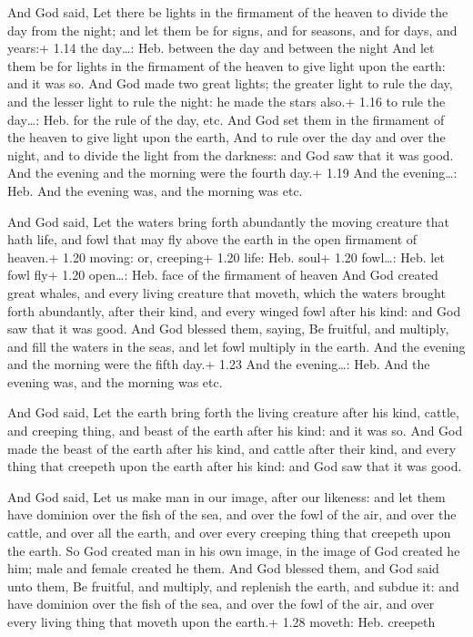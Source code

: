  And God said, Let there be lights in the firmament of
the heaven to divide the day from the night; and let them be for signs,
and for seasons, and for days, and years:+ 1.14 the day\ldots: Heb.
between the day and between the night  And let them be for
lights in the firmament of the heaven to give light upon the earth: and
it was so.  And God made two great lights; the greater
light to rule the day, and the lesser light to rule the night: he made
the stars also.+ 1.16 to rule the day\ldots: Heb. for the rule of the
day, etc.  And God set them in the firmament of the heaven
to give light upon the earth,  And to rule over the day and
over the night, and to divide the light from the darkness: and God saw
that it was good.  And the evening and the morning were the
fourth day.+ 1.19 And the evening\ldots: Heb. And the evening was, and
the morning was etc.

 And God said, Let the waters bring forth abundantly the
moving creature that hath life, and fowl that may fly above the earth in
the open firmament of heaven.+ 1.20 moving: or, creeping+ 1.20 life:
Heb. soul+ 1.20 fowl\ldots: Heb. let fowl fly+ 1.20 open\ldots: Heb.
face of the firmament of heaven  And God created great
whales, and every living creature that moveth, which the waters brought
forth abundantly, after their kind, and every winged fowl after his
kind: and God saw that it was good.  And God blessed them,
saying, Be fruitful, and multiply, and fill the waters in the seas, and
let fowl multiply in the earth.  And the evening and the
morning were the fifth day.+ 1.23 And the evening\ldots: Heb. And the
evening was, and the morning was etc.

 And God said, Let the earth bring forth the living
creature after his kind, cattle, and creeping thing, and beast of the
earth after his kind: and it was so.  And God made the
beast of the earth after his kind, and cattle after their kind, and
every thing that creepeth upon the earth after his kind: and God saw
that it was good.

 And God said, Let us make man in our image, after our
likeness: and let them have dominion over the fish of the sea, and over
the fowl of the air, and over the cattle, and over all the earth, and
over every creeping thing that creepeth upon the earth.  So
God created man in his own image, in the image of God created he him;
male and female created he them.  And God blessed them, and
God said unto them, Be fruitful, and multiply, and replenish the earth,
and subdue it: and have dominion over the fish of the sea, and over the
fowl of the air, and over every living thing that moveth upon the
earth.+ 1.28 moveth: Heb. creepeth

